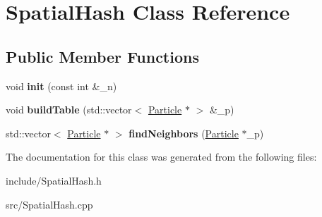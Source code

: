 \hypertarget{classSpatialHash}{}\section{Spatial\+Hash Class Reference}
\label{classSpatialHash}
\subsection*{Public Member Functions}
\begin{DoxyCompactItemize}
\item 
void {\bfseries init} (const int \&\+\_\+n)\hypertarget{classSpatialHash_a7d348b18ec63bdf739d8ea5301c9a00c}{}\label{classSpatialHash_a7d348b18ec63bdf739d8ea5301c9a00c}

\item 
void {\bfseries build\+Table} (std\+::vector$<$ \hyperlink{structParticle}{Particle} $\ast$ $>$ \&\+\_\+p)\hypertarget{classSpatialHash_ac143053cb29abb634daca8723b054b67}{}\label{classSpatialHash_ac143053cb29abb634daca8723b054b67}

\item 
std\+::vector$<$ \hyperlink{structParticle}{Particle} $\ast$ $>$ {\bfseries find\+Neighbors} (\hyperlink{structParticle}{Particle} $\ast$\+\_\+p)\hypertarget{classSpatialHash_a7d6206d10e709f641b755df8a002738f}{}\label{classSpatialHash_a7d6206d10e709f641b755df8a002738f}

\end{DoxyCompactItemize}


The documentation for this class was generated from the following files\+:\begin{DoxyCompactItemize}
\item 
include/Spatial\+Hash.\+h\item 
src/Spatial\+Hash.\+cpp\end{DoxyCompactItemize}
